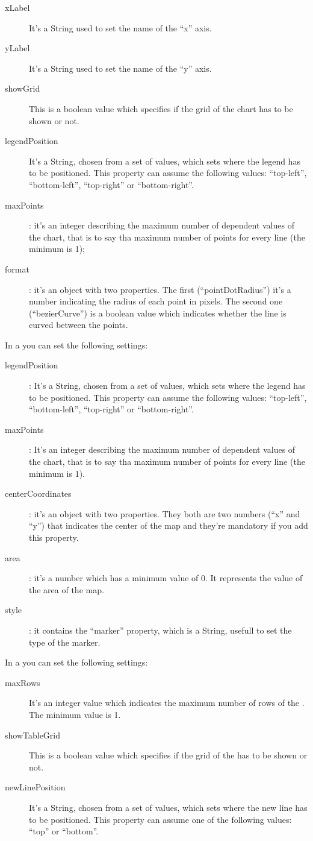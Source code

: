 			\begin{description}
				\item[xLabel] It's a String used to set the name of the “x” axis.
				\item[yLabel] It's a String used to set the name of the “y” axis.
				\item[showGrid] This is a boolean value which specifies if the grid of the chart has to be shown or not.
				\item[legendPosition] It's a String, chosen from a set of values, which sets where the legend has to be positioned. This property can assume the following values: “top-left”, “bottom-left”, “top-right” or “bottom-right”.
				\item[maxPoints]: it's an integer describing the maximum number of dependent values of the chart, that is to say tha maximum number of points for every line (the minimum is 1);
				\item[format]: it's an object with two properties. The first (“pointDotRadius”) it's a number indicating the radius of each point in pixels. The second one (“bezierCurve”) is a boolean value which indicates whether the line is curved between the points.
			\end{description}
			In a  you can set the following settings:
			\begin{description}
				\item[legendPosition]: It's a String, chosen from a set of values, which sets where the legend has to be positioned. This property can assume the following values: “top-left”, “bottom-left”, “top-right” or “bottom-right”.
				\item[maxPoints]: It's an integer describing the maximum number of dependent values of the chart, that is to say tha maximum number of points for every line (the minimum is 1).
				\item[centerCoordinates]: it's an object with two properties. They both are two numbers (“x” and “y”) that indicates the center of the map and they're mandatory if you add this property.
				\item[area]: it's a number which has a minimum value of 0. It represents the value of the area of the map.
				\item[style]: it contains the “marker” property, which is a String, usefull to set the type of the marker.
			\end{description}
			In a  you can set the following settings:
			\begin{description}
				\item[maxRows] It's an integer value which indicates the maximum number of rows of the . The minimum value is 1.
				\item[showTableGrid] This is a boolean value which specifies if the grid of the  has to be shown or not.
				\item[newLinePosition] It's a String, chosen from a set of values, which sets where the new line has to be positioned. This property can assume one of the following values: “top” or “bottom”.
			\end{description}


